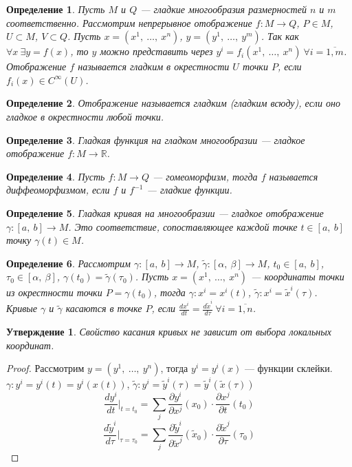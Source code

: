 \documentclass[12pt]{article}
\theoremstyle{plain}
\newtheorem{subtheorem}{Утверждение}[section]
\newtheorem{definition}{Определение}[section]
\newcommand{\R}{\mathbb R}
\begin{document}
    \begin{definition}
        Пусть $M$ и $Q$ --- гладкие многообразия размерностей $n$ и $m$ соответственно. Рассмотрим непрерывное отображение $f:M\to Q$, $P\in M$, $U\subset M$, $V\subset Q$. Пусть $x=(x^1, \ \ldots, \ x^n)$, $y=(y^1, \ \ldots, \ y^m)$. Так как $\forall x \ \exists y=f(x)$, то $y$ можно представить через $y^i=f_i(x^1, \ \ldots, \ x^n) \ \forall i=\overline{1,m}$.\\
        Отображение $f$ называется гладким в окрестности $U$ точки $P$, если $f_i(x)\in C^{\infty}(U)$.
    \end{definition}
    \begin{definition}
        Отображение называется гладким (гладким всюду), если оно гладкое в окрестности любой точки.
    \end{definition}
    \begin{definition}
        Гладкая функция на гладком многообразии --- гладкое отображение $f:M\to\R$.
    \end{definition}
    \begin{definition}
        Пусть $f:M\to Q$ --- гомеоморфизм, тогда $f$ называется диффеоморфизмом, если $f$ и $f^{-1}$ --- гладкие функции.
    \end{definition}
    \begin{definition}
        Гладкая кривая на многообразии --- гладкое отображение $\gamma:[a, \ b]\to M$. Это соответствие, сопоставляющее каждой точке $t\in[a, \ b]$ точку $\gamma(t)\in M$.
    \end{definition}
    \begin{definition}
        Рассмотрим $\gamma:[a, \ b]\to M$, $\tilde{\gamma}:[\alpha, \ \beta]\to M$, $t_0\in[a, \ b]$, $\tau_0\in[\alpha, \ \beta]$, $\gamma(t_0)=\tilde{\gamma}(\tau_0)$. Пусть $x=(x^1, \ \ldots, \ x^n)$ --- координаты точки из окрестности точки $P=\gamma(t_0)$, тогда $\gamma:x^i=x^i(t)$, $\tilde{\gamma}:x^i=\tilde{x}^i(\tau)$.\\
        Кривые $\gamma$ и $\tilde{\gamma}$ касаются в точке $P$, если $\frac{dx^i}{dt}=\frac{d\tilde{x}^i}{d\tau} \ \forall i=\overline{1,n}$.
    \end{definition}
    \begin{subtheorem}
        Свойство касания кривых не зависит от выбора локальных координат.
    \end{subtheorem}
    \begin{proof}
        Рассмотрим $y=(y^1, \ \ldots, \ y^n)$, тогда $y^i=y^i(x)$ --- функции склейки.\\$\gamma:y^i=y^i(t)=y^i(x(t))$, $\tilde{\gamma}:y^i=\tilde{y}^i(\tau)=\tilde{y}^i(\tilde{x}(\tau))$
        $$\frac{dy^i}{dt}|_{t=t_0}=\sum\limits_j\frac{\partial y^i}{\partial x^j}(x_0)\cdot\frac{\partial x^j}{\partial t}(t_0)$$
        $$\frac{d\tilde{y}^i}{d\tau}|_{\tau=\tau_0}=\sum\limits_j\frac{\partial \tilde{y}^i}{\partial \tilde{x}^j}(\tilde{x}_0)\cdot\frac{\partial \tilde{x}^j}{\partial \tau}(\tau_0)$$
    \end{proof}
\end{document}

